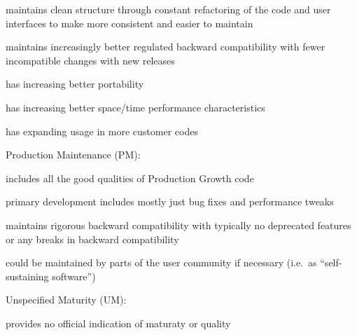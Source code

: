 \documentclass[11pt]{SANDreport}
\begin{document}
\begin{compactenum}
\begin{compactitem}
{}\item maintains clean structure through constant refactoring of the
code and user interfaces to make more consistent and easier to
maintain

{}\item maintains increasingly better regulated backward compatibility
with fewer incompatible changes with new releases

{}\item has increasing better portability

{}\item has increasing better space/time performance characteristics

{}\item has expanding usage in more customer codes

\end{compactitem}

{}\item Production Maintenance (PM):

\begin{compactitem}

{}\item includes all the good qualities of Production Growth code

{}\item primary development includes mostly just bug fixes and
performance tweaks

{}\item maintains rigorous backward compatibility with typically no
deprecated features or any breaks in backward compatibility

{}\item could be maintained by parts of the user community if
necessary (i.e.\ as ``self-sustaining software'')

\end{compactitem}

{}\item Unspecified Maturity (UM):

\begin{compactitem}

{}\item provides no official indication of maturaty or quality

\end{compactitem}

\end{compactenum}
\end{document}
